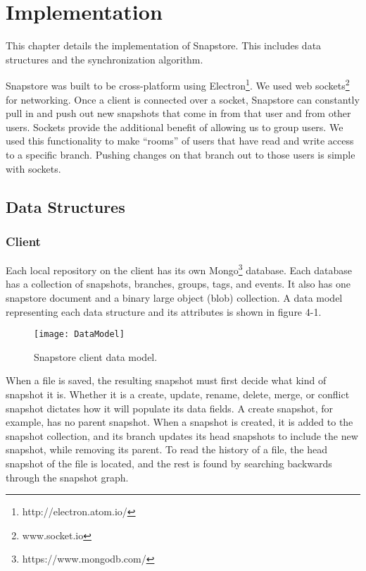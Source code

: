 \chapter{Implementation}

This chapter details the implementation of Snapstore. This includes data structures and the synchronization algorithm. 

Snapstore was built to be cross-platform using Electron\footnote{http://electron.atom.io/}. We used web sockets\footnote{www.socket.io} for networking. Once a client is connected over a socket, Snapstore can constantly pull in and push out new snapshots that come in from that user and from other users. Sockets provide the additional benefit of allowing us to group users. We used this functionality to make ``rooms'' of users that have read and write access to a specific branch. Pushing changes on that branch out to those users is simple with sockets.

\section{Data Structures}

\subsection{Client}

Each local repository on the client has its own Mongo\footnote{https://www.mongodb.com/} database. Each database has a collection of snapshots, branches, groups, tags, and events. It also has one snapstore document and a binary large object (blob) collection. A data model representing each data structure and its attributes is shown in figure 4-1.

\begin{figure}
\texttt{[image: DataModel]}
\caption{Snapstore client data model.}
\label{arm:fig1}
\end{figure}

When a file is saved, the resulting snapshot must first decide what kind of snapshot it is. Whether it is a create, update, rename, delete, merge, or conflict snapshot dictates how it will populate its data fields. A create snapshot, for example, has no parent snapshot. When a snapshot is created, it is added to the snapshot collection, and its branch updates its head snapshots to include the new snapshot, while removing its parent. To read the history of a file, the head snapshot of the file is located, and the rest is found by searching backwards through the snapshot graph.

